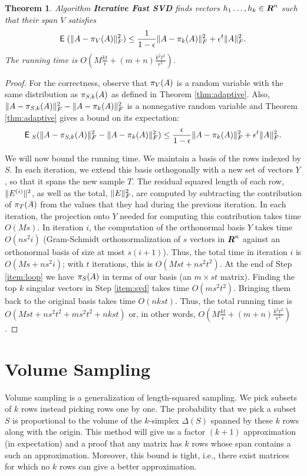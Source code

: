 \documentclass{book}
\newtheorem{theorem}{Theorem}[chapter]
\numberwithin{exercise}{chapter}
\begin{document}
\begin{theorem}
Algorithm {\bf Iterative Fast SVD} finds vectors $h_1 \dotsc, h_k \in
\mbox{\mbox{\boldmath $R$}}^{n}$ such that their span $V$ satisfies
\begin{equation}\label{equ:algorithm}
\hbox{{\sf E}\;}(\|A - \pi_V(A)\|_{F}^2) \leq \frac{1}{1-\epsilon} \|A -
\pi_k(A)\|_{F}^2 + \epsilon^t \|A\|_{F}^2.
\end{equation}
The running time is $O\left(M \frac{kt}{\epsilon} + (m+n)\frac{k^2
t^2}{\epsilon^2}\right)$.
\end{theorem}
\begin{proof}
For the correctness, observe that $\pi_{V}(A)$ is a random
variable with the same distribution as $\pi_{S,k}(A)$ as defined
in Theorem \ref{thm:adaptive}. Also, $\|A - \pi_{S,k}(A)\|_{F}^2 -
\|A - \pi_k(A)\|_{F}^2$ is a nonnegative random variable and
Theorem \ref{thm:adaptive} gives a bound on its expectation:
\[
\hbox{{\sf E}\;}_{S} (\|A-\pi_{S,k}(A)\|_{F}^2 - \|A - \pi_k(A)\|_{F}^2) \leq
\frac{\epsilon}{1-\epsilon} \|A-\pi_k (A)\|_{F}^2 + \epsilon^t\|A\|_{F}^2.
\]

We will now bound the running time. We maintain a basis of the
rows indexed by $S$. In each iteration, we extend this basis
orthogonally with a new set of vectors $Y$, so that it spans the
new sample $T$. The residual squared length of each row,
$\|E^{(i)}\|^2$, as well as the total, $\|E\|_{F}^2$, are
computed by subtracting the contribution of $\pi_{T}(A)$ from
the values that they had during the previous iteration. In each
iteration, the projection onto $Y$ needed for computing this
contribution takes time $O(Ms)$.  In iteration $i$, the
computation of the orthonormal basis $Y$ takes time $O(ns^2i)$
(Gram-Schmidt orthonormalization of $s$ vectors in $\mbox{\mbox{\boldmath $R$}}^n$
against an orthonormal basis of size at most $s(i+1)$). Thus, the
total time in iteration $i$ is $O(M s + n s^2 i)$; with $t$
iterations, this is $O(M s t + ns^2 t^2)$. At the end of Step
\ref{item:loop} we have $\pi_{S}(A)$ in terms of our basis (an
$m \times st$ matrix).  Finding the top $k$ singular vectors in
Step \ref{item:svd} takes time $O(m s^2 t^2)$. Bringing them back
to the original basis takes time $O(nkst)$. Thus, the total
running time is $O(Mst + n s^2 t^2 + ms^2 t^2 + nkst)$ or, in
other words, $O\left(M \frac{kt}{\epsilon} + (m+n)\frac{k^2
t^2}{\epsilon^2}\right)$.
\end{proof}

\section{Volume Sampling}\label{sec:relative}
Volume sampling is a generalization of length-squared sampling. We pick
subsets of $k$ rows instead picking rows one by one. The
probability that we pick a subset $S$ is proportional to the
volume of the $k$-simplex $\Delta(S)$ spanned by these $k$ rows
along with the origin. This method will give us a factor
$(k+1)$ approximation (in expectation) and a proof that any matrix has $k$ rows whose span contains a such an approximation. Moreover, this bound is tight, i.e., there exist matrices for which no $k$ rows can give a better approximation.
\end{document}

